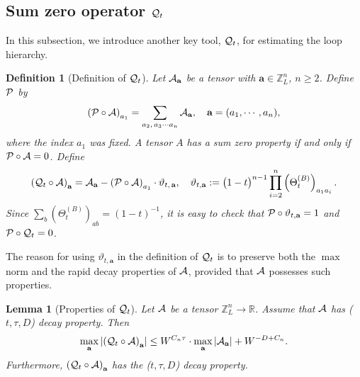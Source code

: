 \documentclass[10pt,reqno]{article}
\theoremstyle{plain} %
\newtheorem{lemma}[theorem]{Lemma}
\newtheorem{definition}[theorem]{Definition}
\theoremstyle{remark}
\numberwithin{equation}{section}
\begin{document}
 

\subsection{Sum zero operator \texorpdfstring{${\cal Q}_t$}{Qt}}
In this subsection, we introduce another key tool, ${\cal Q}_t$,  for estimating the loop hierarchy. 
\begin{definition}[Definition of ${\cal Q}_t$]\label{Def:QtPt} Let ${\cal A}_\textbf{a}$ be a tensor with $\textbf{a}\in\mathbb Z_L^n$, $n\ge 2$.   Define ${\cal P}$  by
$$
\left( {\cal P} \circ {\cal A}\right)_{a_1}= \sum_{a_2,\, a_3\cdots a_n}  {\cal A}_{\textbf{a}} ,\quad \textbf{a}=(a_1,\cdots,a_n), 
$$
where the index $a_1$ was fixed. A tensor $A$ has a sum zero property if and only if $ {\cal P} \circ {\cal A}= 0$.   Define 
$$
 \left({\cal Q}_t\circ {\cal A}\right)_{\textbf{a}}={\cal A}_{\textbf{a}}-\left({\cal P} \circ {\cal A}\right)_{a_1}
 \cdot {  \vartheta}_{t,\,\textbf{a}},\quad 
 {  \vartheta}_{t, \textbf{a}}:=\big(1-t\big)^{n-1}\prod_{i=2}^n \left(\Theta^{(B)}_t\right)_{a_1a_i}.
$$
Since $\sum_b\left(\Theta^{(B)}_t\right)_{ab}=(1-t)^{-1}$, it is easy to check that $ {\cal P} \circ  \vartheta_{t,\textbf{a}}=1$ 
and  ${\cal P} \circ {\cal Q}_t =0$. 
\end{definition}
The reason for using $\vartheta_{t,\textbf{a}}$ in the definition of ${\cal Q}_t$ is to preserve both  the $\max$ norm and the rapid decay properties of ${\cal A}$, provided that ${\cal A}$ possesses such properties.

\begin{lemma}[Properties of ${\cal Q}_t$]\label{lem_+Q} 
Let  $\cal A$ be a tensor $\mathbb Z_L^n\to \mathbb R$. Assume that  $\cal A$ has ($t, \tau, D$) decay property. %
Then  
\begin{align}\label{normQA}
        \max_{\textbf{a}} \left|\left({\cal Q}_t\circ \cal A\right)_{\textbf{a}}\right| \le W^{C_n \tau} \cdot \max_{\textbf{a}} \left|{\cal A}_{\textbf{a}}\right|+W^{-D+C_n}. 
\end{align}
Furthermore,   
$\left({\cal Q}_t\circ \cal A\right)_{\textbf{a}}$ has the ($ t, \tau, D$) decay property. 
\end{lemma}
\end{document}
